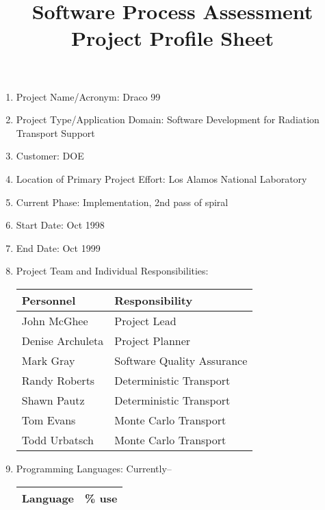 % 
% 
% 
% 
\title{Software Process Assessment\\ Project Profile Sheet}
\pagestyle{myheadings}

\maketitle
\begin{enumerate}
\item Project Name/Acronym: Draco 99
\item Project Type/Application Domain: Software Development for
Radiation Transport Support 
\item Customer: DOE
\item Location of Primary Project Effort: Los Alamos National
Laboratory
\item Current Phase: Implementation, 2nd pass of spiral
\item Start Date: Oct 1998
\item End Date: Oct 1999
\item Project Team and Individual Responsibilities:
\begin{center}
\begin{tabular}{l|l}
Personnel & Responsibility \\ \hline
John McGhee & Project Lead \\
Denise Archuleta & Project Planner \\
Mark Gray & Software Quality Assurance \\
Randy Roberts & Deterministic Transport \\
Shawn Pautz & Deterministic Transport \\
Tom Evans & Monte Carlo Transport \\
Todd Urbatsch & Monte Carlo Transport \\
\end{tabular}
\end{center}
\item Programming Languages: Currently--
\begin{center}
\begin{tabular}{l|r}
Language & \% use \\ \hline

\end{tabular}
\end{center}
\end{enumerate}
